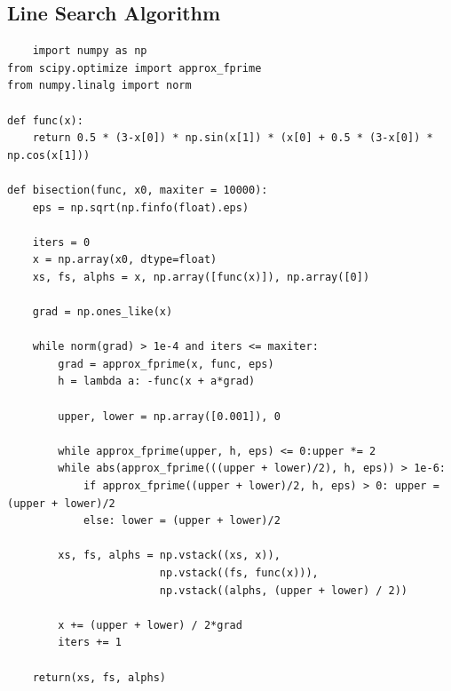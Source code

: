 \documentclass{article}
\begin{document}
\subsection*{Line Search Algorithm}
\begin{verbatim}
	import numpy as np
from scipy.optimize import approx_fprime
from numpy.linalg import norm

def func(x):
    return 0.5 * (3-x[0]) * np.sin(x[1]) * (x[0] + 0.5 * (3-x[0]) * np.cos(x[1]))

def bisection(func, x0, maxiter = 10000):
    eps = np.sqrt(np.finfo(float).eps)  
    
    iters = 0  
    x = np.array(x0, dtype=float)
    xs, fs, alphs = x, np.array([func(x)]), np.array([0])
    
    grad = np.ones_like(x)
    
    while norm(grad) > 1e-4 and iters <= maxiter:
        grad = approx_fprime(x, func, eps)
        h = lambda a: -func(x + a*grad)
        
        upper, lower = np.array([0.001]), 0
        
        while approx_fprime(upper, h, eps) <= 0:upper *= 2
        while abs(approx_fprime(((upper + lower)/2), h, eps)) > 1e-6:
            if approx_fprime((upper + lower)/2, h, eps) > 0: upper = (upper + lower)/2
            else: lower = (upper + lower)/2
        
        xs, fs, alphs = np.vstack((xs, x)), 
        				np.vstack((fs, func(x))), 
        				np.vstack((alphs, (upper + lower) / 2))
        
        x += (upper + lower) / 2*grad
        iters += 1
    
    return(xs, fs, alphs)
\end{verbatim}

\end{document}
